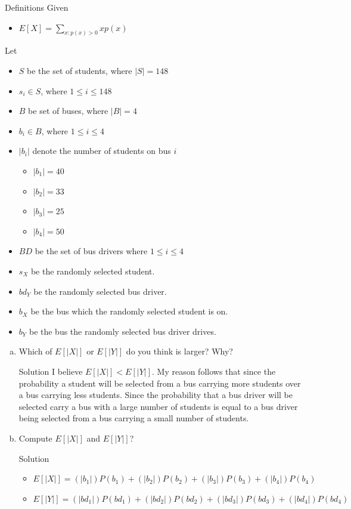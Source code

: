 \documentclass{article}
\begin{document}
\begin{spacing}{1.1}
\begin{homeworkProblem}
\begin{homeworkSection}{Definitions}
    Given
      \begin{itemize}
        \item $E[ X] = \sum\limits_{x:p( x) > 0}{ x p( x)}$
      \end{itemize}
    Let
      \begin{itemize}
        \item $S$ be the set of students, where $|S| = 148$
        \item $s_i \in S$, where $1 \le i \le 148$
        \item $B$ be set of buses, where $|B| = 4$
        \item $b_i \in B$, where $1 \le i \le 4$
        \item $|b_i|$ denote the number of students on bus $i$
          \begin{itemize}
            \item $|b_1| = 40$
            \item $|b_2| = 33$
            \item $|b_3| = 25$
            \item $|b_4| = 50$
          \end{itemize}
        \item $BD$ be the set of bus drivers where $1 \le i \le 4$
        \item $s_X$ be the randomly selected student.
        \item $bd_Y$ be the randomly selected bus driver.
        \item $b_X$ be the bus which the randomly selected student is on.
        \item $b_Y$ be the bus the randomly selected bus driver drives.
      \end{itemize}
  \end{homeworkSection}
  \begin{enumerate}[(a)]
    \item Which of $E[ |X|]$ or $E[ |Y|]$ do you think is larger? Why?
      \begin{homeworkSection}{Solution}
        I believe $E[ |X|] < E[ |Y|]$.  My reason follows that since the 
        probability a student will be selected from a bus carrying more students 
        over a bus carrying less students.  
        Since the probability that a bus driver will be selected carry a bus with a large
        number of students is equal to a bus driver being selected from a bus carrying
        a small number of students.
      \end{homeworkSection}
    \item Compute $E[ |X|]$ and $E[ |Y|]$?
      \begin{homeworkSection}{Solution}
        \begin{itemize}
          \item $E[ |X|] = (|b_1|) P( b_1) + (|b_2|) P( b_2) + (|b_3|) P( b_3) + (|b_4|) P( b_4)$
          \item $E[ |Y|] = (|bd_1|) P( bd_1) + (|bd_2|) P( bd_2) + (|bd_3|) P( bd_3) + (|bd_4|) P( bd_4)$
        \end{itemize}


\end{homeworkSection}
\end{enumerate}
\end{homeworkProblem}
\end{spacing}
\end{document}
